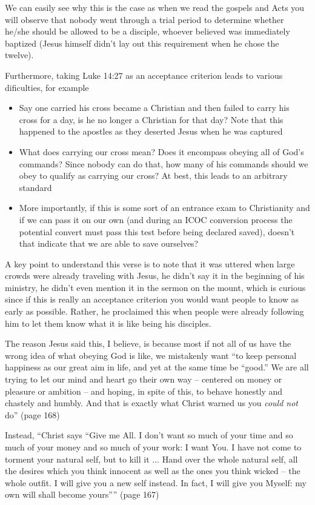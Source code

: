 \documentclass[aps,preprint,preprintnumbers,nofootinbib,showpacs,prd]{revtex4-1}
\newcommand{\bit}{\begin{itemize}}
\newcommand{\eit}{\end{itemize}}
\begin{document}
We can easily see why this is the case as when we read the gospels and Acts you will observe that nobody went through a trial period to determine whether he/she should be allowed to be a disciple, whoever believed was immediately baptized (Jesus himself didn't lay out this requirement when he chose the twelve).

Furthermore, taking Luke 14:27 as an acceptance criterion leads to various dificulties, for example
\bit
\item Say one carried his cross became a Christian and then failed to carry his cross for a day, is he no longer a Christian for that day? Note that this happened to the apostles as they deserted Jesus when he was captured
\item What does carrying our cross mean? Does it encompass obeying all of God's commands? Since nobody can do that, how many of his commands should we obey to qualify as carrying our cross? At best, this leads to an arbitrary standard
\item More importantly, if this is some sort of an entrance exam to Christianity and if we can pass it on our own (and during an ICOC conversion process the potential convert must pass this test before being declared saved), doesn't that indicate that we are able to save ourselves?
\eit

A key point to understand this verse is to note that it was uttered when large crowds were already traveling with Jesus, he didn't say it in the beginning of his ministry, he didn't even mention it in the sermon on the mount, which is curious since if this is really an acceptance criterion you would want people to know as early as possible. Rather, he proclaimed this when people were already following him to let them know what it is like being his disciples.

The reason Jesus said this, I believe, is because most if not all of us have the wrong idea of what obeying God is like, we mistakenly want ``to keep personal happiness as our great aim in life, and yet at the same time be ``good.'' We are all trying to let our mind and heart go their own way -- centered on money or pleasure or ambition -- and hoping, in spite of this, to behave honestly and chastely and humbly. And that is exactly what Christ warned us you {\it could not} do'' (page 168)

Instead, ``Christ says ``Give me All. I don't want so much of your time and so much of your money and so much of your work: I want You. I have not come to torment your natural self, but to kill it $\dots$ Hand over the whole natural self, all the desires which you think innocent as well as the ones you think wicked -- the whole outfit. I will give you a new self instead. In fact, I will give you Myself: my own will shall become yours'''' (page 167)
\end{document}
